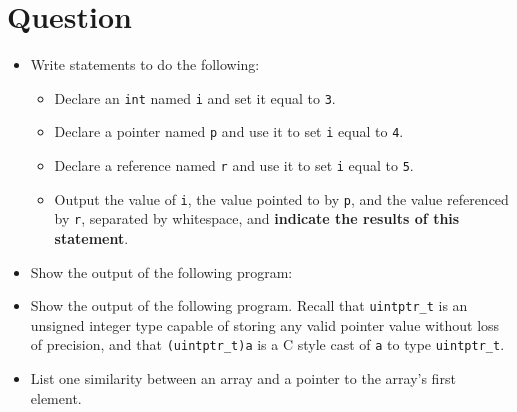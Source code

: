 \newpage


\section{Question}

\begin{itemize}

  \item Write statements to do the following:
    \begin{itemize}
      \item Declare an \texttt{int} named \texttt{i} and set
        it equal to \texttt{3}.
      \item Declare a pointer named \texttt{p} and use it to set
        \texttt{i} equal to \texttt{4}.
      \item Declare a reference named \texttt{r} and use it to set
        \texttt{i} equal to \texttt{5}.
      \item Output the value of \texttt{i}, the value pointed to by
        \texttt{p}, and the value referenced by \texttt{r},
        separated by whitespace, and \textbf{indicate the results of this
        statement}.
    \end{itemize}
    \vfill

  \item Show the output of the following program:

    \filbreak

  \item Show the output of the following program.  Recall that
    \texttt{uintptr_t} is an unsigned integer type capable of
    storing any valid pointer value without loss of precision, and that
    \texttt{(uintptr_t)a} is a C style cast of \texttt{a} to
    type \texttt{uintptr_t}.
    \vspace{3ex}

  \item List one similarity between an array and a pointer to the array's first
    element.
    \vfill


\end{itemize}
